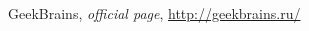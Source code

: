 \begin{thebibliography}{99999}
\singlespace\normalsize

 GeekBrains, \textit{ official page}, \url{http://geekbrains.ru/}

\end{thebibliography}
